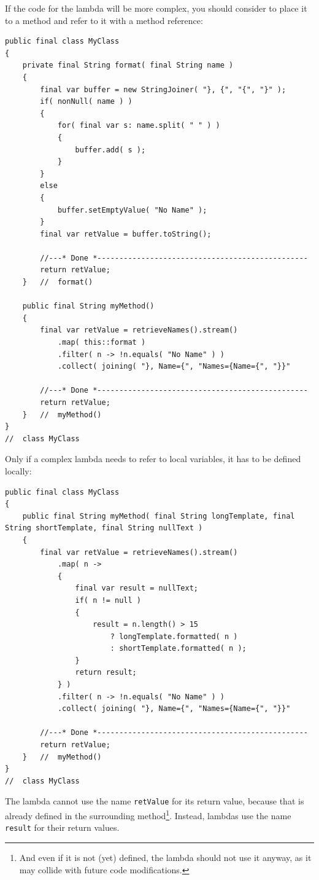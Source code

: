 \documentclass[11pt,a4paper, titlepage, parskip=half, headsepline, footsepline, cleardoublepage=current, headheight=1cm]{scrbook}
\begin{document}
If the code for the lambda will be more complex, you should consider to place it to a method and
refer to it with a method reference:
\begin{lstlisting}
public final class MyClass
{
    private final String format( final String name )
    {
        final var buffer = new StringJoiner( "}, {", "{", "}" );
        if( nonNull( name ) )
        {
            for( final var s: name.split( " " ) )
            {
                buffer.add( s );
            }
        }
        else
        {
            buffer.setEmptyValue( "No Name" );
        }
        final var retValue = buffer.toString();
        
        //---* Done *------------------------------------------------
        return retValue;
    }   //  format()
    
    public final String myMethod()
    {
        final var retValue = retrieveNames().stream()
            .map( this::format )
            .filter( n -> !n.equals( "No Name" ) )
            .collect( joining( "}, Name={", "Names={Name={", "}}"
        
        //---* Done *------------------------------------------------
        return retValue;
    }   //  myMethod()
}
//  class MyClass
\end{lstlisting}

Only if a complex lambda needs to refer to local variables, it has to be defined locally:
\begin{lstlisting}
public final class MyClass
{
    public final String myMethod( final String longTemplate, final String shortTemplate, final String nullText )
    {
        final var retValue = retrieveNames().stream()
            .map( n ->
            {
                final var result = nullText;
                if( n != null )
                {
                    result = n.length() > 15 
                        ? longTemplate.formatted( n ) 
                        : shortTemplate.formatted( n );
                }
                return result;
            } )
            .filter( n -> !n.equals( "No Name" ) )
            .collect( joining( "}, Name={", "Names={Name={", "}}"
        
        //---* Done *------------------------------------------------
        return retValue;
    }   //  myMethod()
}
//  class MyClass
\end{lstlisting}
The lambda cannot use the name \lstinline|retValue| for its return value, because that is already defined in the surrounding method\footnote{And even if it is not (yet) defined, the lambda should not use it anyway, as it may collide with future code modifications.}. Instead, lambdas use the name \lstinline|result| for their return values.
\end{document}
